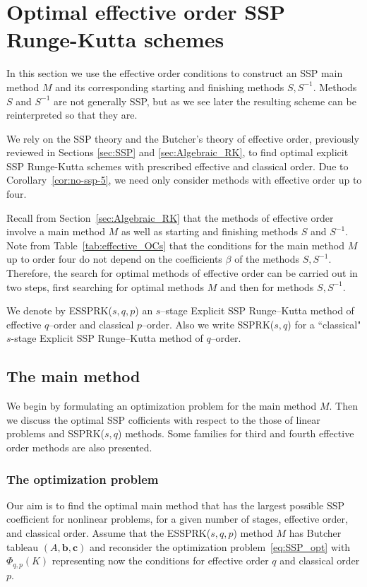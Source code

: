 \section{Optimal effective order SSP Runge-Kutta schemes}\label{sec:optimal_ESSPRK}
In this section we use the effective order conditions to construct an SSP main method $M$ and 
its corresponding starting and finishing methods $S, S^{-1}$. 
Methods $S$ and $S^{-1}$ are not generally SSP, but as we see later the resulting scheme can 
be reinterpreted so that they are.

We rely on the SSP theory and the Butcher's theory of effective order, previously reviewed in 
Sections \ref{sec:SSP} and \ref{sec:Algebraic_RK}, to find optimal explicit SSP Runge-Kutta 
schemes with prescribed effective and classical order. 
Due to Corollary~\ref{cor:no-ssp-5}, we need only consider methods with effective order up 
to four.

Recall from Section~\ref{sec:Algebraic_RK} that the methods of effective order involve a main 
method $M$ as well as starting and finishing methods $S$ and $S^{-1}$.
Note from Table~\ref{tab:effective_OCs} that the conditions for the main method $M$ up to 
order four do not depend on the coefficients $\beta$ of the methods $S, S^{-1}$. 
Therefore, the search for optimal methods of effective order can be carried out in two steps, 
first searching for optimal methods $M$ and then for methods $S, S^{-1}$.

We denote by ESSPRK($s,q,p$) an $s$--stage Explicit SSP Runge--Kutta method of effective 
$q$--order and classical $p$--order. 
Also we write SSPRK($s,q$) for a ``classical" $s$-stage Explicit SSP Runge--Kutta method of 
$q$--order.

\subsection{The main method}\label{subsec:main_method}
We begin by formulating an optimization problem for the main method $M$. 
Then we discuss the optimal SSP cofficients with respect to the those of linear problems and 
SSPRK($s,q$) methods. Some families for third and fourth effective order methods are also 
presented.

\subsubsection{The optimization problem}\label{subsubsec:opt_problem}
Our aim is to find the optimal main method that has the largest possible SSP coefficient for 
nonlinear problems, for a given number of stages, effective order, and classical order. 
Assume that the ESSPRK($s,q,p$) method $M$ has Butcher tableau
$(A, \bm{b}, \bm{c})$ and 
reconsider the optimization problem~\eqref{eq:SSP_opt} with $\Phi_{q,p}(K)$ representing 
now the conditions for effective order $q$ and classical order $p$.

